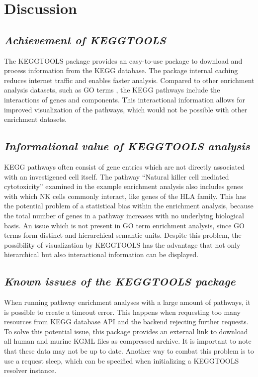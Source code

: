 \documentclass[11pt,a4paper]{article}
\begin{document}
\section*{Discussion}

\subsection*{\textit{Achievement of KEGGTOOLS}}

The KEGGTOOLS package provides an easy-to-use package to download and process information from
the KEGG database. The package internal caching reduces internet traffic and enables faster
analysis. Compared to other enrichment analysis datasets, such as GO terms \cite{goterm}, the KEGG pathways
include the interactions of genes and components. This interactional information allows for
improved visualization of the pathways, which would not be possible with other enrichment
datasets.

\subsection*{\textit{Informational value of KEGGTOOLS analysis}}

KEGG pathways often consist of gene entries which are not directly associated with an
investigened cell itself. The pathway “Natural killer cell mediated cytotoxicity” examined
in the example enrichment analysis also includes genes with which NK cells commonly
interact, like genes of the HLA family. This has the potential problem of a statistical
bias within the enrichment analysis, because the total number of genes in a pathway
increases with no underlying biological basis. An issue which is not present in GO
term enrichment analysis, since GO terms form distinct and hierarchical semantic
units\cite{goterm}. Despite this problem, the possibility of visualization by KEGGTOOLS
has the advantage that not only hierarchical but also interactional information can
be displayed.

\subsection*{\textit{Known issues of the KEGGTOOLS package}}

When running pathway enrichment analyses with a large amount of pathways, it is
possible to create a timeout error. This happens when requesting too many resources
from KEGG database API and the backend rejecting further requests. To solve this
potential issue, this package provides an external link to download all human and
murine KGML files as compressed archive. It is important to note that these data may
not be up to date. Another way to combat this problem is to use a request sleep, which
can be specified when initializing a KEGGTOOLS resolver instance.
\end{document}
